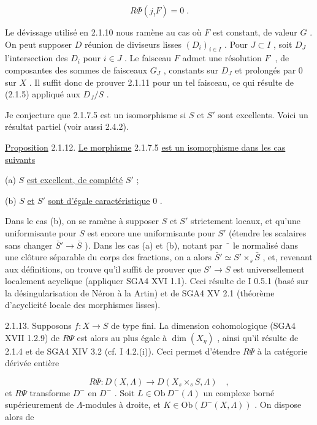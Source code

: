 \begin{equation*}
R\Phi(j_! F) = 0 \;.
\end{equation*}


Le dévissage utilisé en 2.1.10 nous ramène au cas où $F$ est constant, de valeur $G$ . On peut supposer $D$ réunion de diviseurs lisses $(D_i)_{i \in I}$ . Pour $J \subset I$ , soit $D_J$ l'intersection des $D_i$ pour $i \in J$ . Le faisceau $F$ admet une résolution $F^{\cdot}$ , de composantes des sommes de faisceaux $G_J$ , constants sur $D_J$ et prolongés par $0$ sur $X$ . Il suffit donc de prouver 2.1.11 pour un tel faisceau, ce qui résulte de (2.1.5) appliqué aux $D_J/S$ .

Je conjecture que 2.1.7.5 est un isomorphisme si $S$ et $S'$ sont excellents. Voici un résultat partiel (voir aussi 2.4.2).

\underline{Proposition} 2.1.12. \underline{Le morphisme} 2.1.7.5 \underline{est un isomorphisme dans les cas suivants}

(a) $S$ \underline{est excellent, de complété} $S'$ ;

(b) $S$ \underline{et} $S'$ \underline{sont d'égale caractéristique} $0$ .

Dans le cas (b), on se ramène à supposer $S$ et $S'$ strictement locaux, et qu'une uniformisante pour $S$ est encore une uniformisante pour $S'$ (étendre les scalaires sans changer $\bar{S}' \to \bar{S}$ ). Dans les cas (a) et (b), notant par $\bar{\phantom{x}}$ le normalisé dans une clôture séparable du corps des fractions, on a alors $\bar{S}' \simeq S' \times_s \bar{S}$ , et, revenant aux définitions, on trouve qu'il suffit de prouver que $S' \to S$ est universellement localement acyclique (appliquer SGA4 XVI 1.1). Ceci résulte de I 0.5.1 (basé sur la désingularisation de Néron à la Artin) et de SGA4 XV 2.1 (théorème d'acyclicité locale des morphismes lisses).

2.1.13. Supposons $f : X \to S$ de type fini. La dimension cohomologique (SGA4 XVII 1.2.9) de $R\Psi$ est alors au plus égale à $\dim(X_\eta)$ , ainsi qu'il résulte de 2.1.4 et de SGA4 XIV 3.2 (cf. I 4.2.(i)). Ceci permet d'étendre $R\Psi$ à la catégorie dérivée entière

\begin{equation*}
R\Psi : D(X, \Lambda) \longrightarrow D(X_s \times_s S, \Lambda) \quad ,
\end{equation*}
et $R\Psi$ transforme $D^-$ en $D^-$ . Soit $L \in \mathrm{Ob}\ D^-(\Lambda)$ un complexe borné supérieurement de $\Lambda$-modules à droite, et $K \in \mathrm{Ob}(D^-(X, \Lambda))$ . On dispose alors de 


